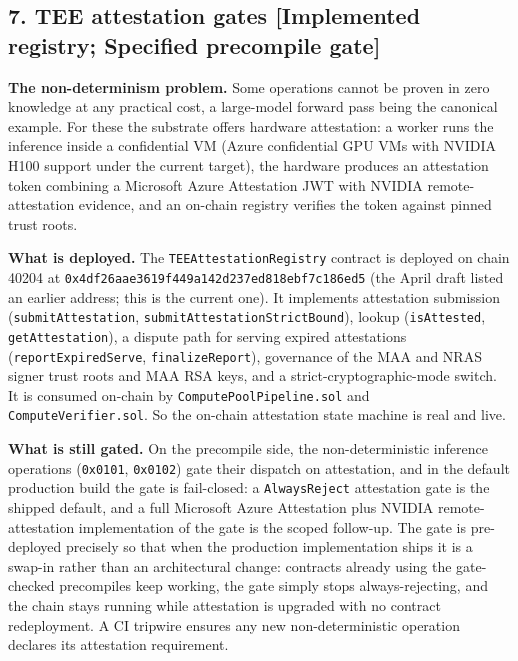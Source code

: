 \subsection{7. TEE attestation gates {[}Implemented registry; Specified
precompile
gate{]}}\label{tee-attestation-gates-implemented-registry-specified-precompile-gate}

\textbf{The non-determinism problem.} Some operations cannot be proven
in zero knowledge at any practical cost, a large-model forward pass
being the canonical example. For these the substrate offers hardware
attestation: a worker runs the inference inside a confidential VM (Azure
confidential GPU VMs with NVIDIA H100 support under the current target),
the hardware produces an attestation token combining a Microsoft Azure
Attestation JWT with NVIDIA remote-attestation evidence, and an on-chain
registry verifies the token against pinned trust roots.

\textbf{What is deployed.} The \texttt{TEEAttestationRegistry} contract
is deployed on chain 40204 at
\texttt{0x4df26aae3619f449a142d237ed818ebf7c186ed5} (the April draft
listed an earlier address; this is the current one). It implements
attestation submission (\texttt{submitAttestation},
\texttt{submitAttestationStrictBound}), lookup (\texttt{isAttested},
\texttt{getAttestation}), a dispute path for serving expired
attestations (\texttt{reportExpiredServe}, \texttt{finalizeReport}),
governance of the MAA and NRAS signer trust roots and MAA RSA keys, and
a strict-cryptographic-mode switch. It is consumed on-chain by
\texttt{ComputePoolPipeline.sol} and \texttt{ComputeVerifier.sol}. So
the on-chain attestation state machine is real and live.

\textbf{What is still gated.} On the precompile side, the
non-deterministic inference operations (\texttt{0x0101},
\texttt{0x0102}) gate their dispatch on attestation, and in the default
production build the gate is fail-closed: a \texttt{AlwaysReject}
attestation gate is the shipped default, and a full Microsoft Azure
Attestation plus NVIDIA remote-attestation implementation of the gate is
the scoped follow-up. The gate is pre-deployed precisely so that when
the production implementation ships it is a swap-in rather than an
architectural change: contracts already using the gate-checked
precompiles keep working, the gate simply stops always-rejecting, and
the chain stays running while attestation is upgraded with no contract
redeployment. A CI tripwire ensures any new non-deterministic operation
declares its attestation requirement.

